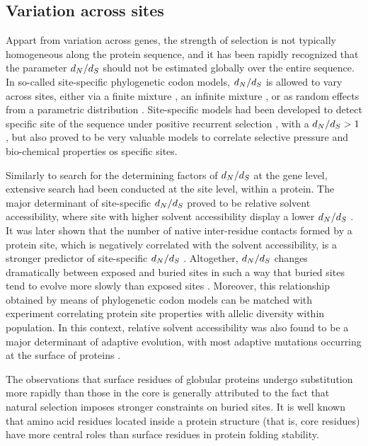 \subsection{Variation across sites}

Appart from variation across genes, the strength of selection is not typically homogeneous along the protein sequence, and it has been rapidly recognized that the parameter $d_N / d_S$ should not be estimated globally over the entire sequence.
In so-called site-specific phylogenetic \gls{codon} models, $d_N / d_S$ is allowed to vary across sites, either via a finite mixture \citep{Yang2001}, an infinite mixture \citep{Huelsenbeck2006}, or as random effects from a parametric distribution \citep{Lartillot2013}.
Site-specific models had been developed to detect specific site of the sequence under positive recurrent selection \citep{kosiol_patterns_2008}, with a $d_N / d_S>1$, but also proved to be very valuable models to correlate selective pressure and bio-chemical properties os specific sites.

Similarly to search for the determining factors of $d_N / d_S$ at the gene level, extensive search had been conducted at the site level, within a protein.
The major determinant of site-specific $d_N / d_S$ proved to be relative solvent accessibility, where site with higher solvent accessibility display a lower $d_N / d_S$ \citep{Ramsey2011}.
It was later shown that the number of native inter-residue contacts formed by a protein site, which is negatively correlated with the solvent accessibility, is a stronger predictor of site-specific $d_N / d_S$ \citep{Yeh2013}.
Altogether, $d_N / d_S$ changes dramatically between exposed and buried sites in such a way that buried sites tend to evolve more slowly than exposed sites \citep{Echave2016}.
Moreover, this relationship obtained by means of phylogenetic \gls{codon} models can be matched with experiment correlating protein site properties with allelic diversity within population.
In this context, relative solvent accessibility was also found to be a major determinant of adaptive evolution, with most adaptive mutations occurring at the surface of proteins \citep{Moutinho2019}.

The observations that surface residues of globular proteins undergo \gls{substitution} more rapidly than those in the core is generally attributed to the fact that natural selection imposes stronger constraints on buried sites.
It is well known that amino acid residues located inside a protein structure (that is, core residues) have more central roles than surface residues in protein folding stability.

